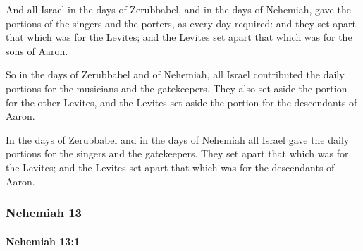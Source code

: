 			\begin{versebox}
					\item[BHS] 
					\item[LXX] 
					\item[ASV] And all Israel in the days of Zerubbabel, and in the days of Nehemiah, gave the portions of the singers and the porters, as every day required: and they set apart that which was for the Levites; and the Levites set apart that which was for the sons of Aaron.
					\item[NIV] So in the days of Zerubbabel and of Nehemiah, all Israel contributed the daily portions for the musicians and the gatekeepers. They also set aside the portion for the other Levites, and the Levites set aside the portion for the descendants of Aaron.
					\item[NRSV] In the days of Zerubbabel and in the days of Nehemiah all Israel gave the daily portions for the singers and the gatekeepers. They set apart that which was for the Levites; and the Levites set apart that which was for the descendants of Aaron.
			\end{versebox}
	\subsubsection{Nehemiah 13} %
		\label{NEHEMIAH-13}

		\paragraph{Nehemiah 13:1} %
			\label{NEHEMIAH-13-1}

